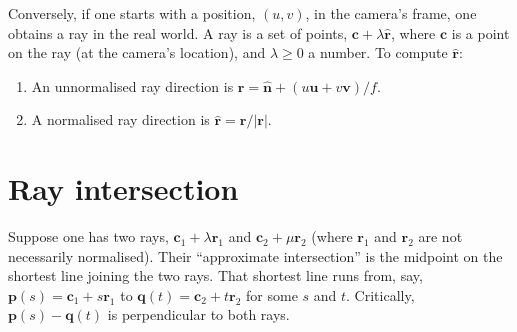 \documentclass{article}
\renewcommand{\vec}[1]{\mathbf{#1}}
\begin{document}
Conversely, if one starts with a position, $(u, v)$, in the camera's
frame, one obtains a ray in the real world. A ray is a set of points,
$\vec{c}+\lambda \hat{\vec{r}}$, where $\vec{c}$ is a point on the ray
(at the camera's location), and $\lambda\geq 0$ a number. To compute
$\hat{\vec{r}}$: 
\begin{enumerate}
\item An unnormalised ray direction is
  $\vec{r} = \hat{\vec{n}} + (u\vec{u}+v\vec{v})/f$.
\item A normalised ray direction is $\hat{\vec{r}} = \vec{r}/\left|\vec{r}\right|$.
\end{enumerate}

\section*{Ray intersection}

Suppose one has two rays, $\vec{c}_1 + \lambda \vec{r}_1$ and
$\vec{c}_2 + \mu\vec{r}_2$ (where $\vec{r}_1$ and $\vec{r}_2$ are not
necessarily normalised). Their ``approximate intersection'' is the
midpoint on the shortest line joining the two rays. That shortest line
runs from, say, $\vec{p}(s) = \vec{c}_1 + s \vec{r}_1$ to
$\vec{q}(t) = \vec{c}_2 + t \vec{r}_2$ for some $s$ and $t$. Critically,
$\vec{p}(s)-\vec{q}(t)$ is perpendicular to both rays.
\end{document}
